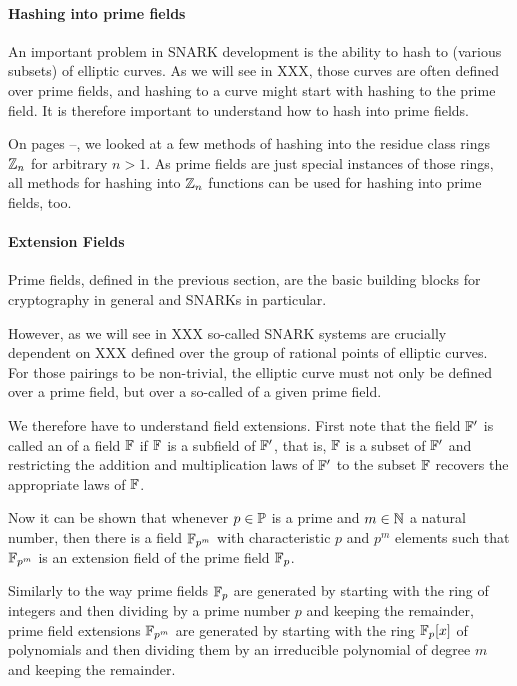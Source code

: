 \paragraph{Hashing into prime fields}\label{hashing-prime-fields}
An important problem in SNARK development is the ability to hash to (various subsets) of elliptic curves. As we will see in XXX, those curves are often defined over prime fields, and hashing to a curve might start with hashing to the prime field. It is therefore important to understand how to hash into prime fields.

On pages \pageref{hashing-start}--\pageref{hashing-end}, we looked at a few methods of hashing into the residue class rings $\mathbb{Z}_n$ for arbitrary $n>1$. As prime fields are just special instances of those rings, all methods for hashing into $\mathbb{Z}_n$ functions can be used for hashing into prime fields, too.
\paragraph{Extension Fields}\label{field-extension}
Prime fields, defined in the previous section, are the basic building blocks for cryptography in general and SNARKs in particular.

However, as we will see in XXX so-called  SNARK systems are crucially dependent on  XXX defined over the group of rational points of elliptic curves. For those pairings to be non-trivial, the elliptic curve must not only be defined over a prime field, but over a so-called  of a given prime field.

We therefore have to understand field extensions. First note that the field $\mathbb{F}'$ is called an  of a field $\mathbb{F}$ if $\mathbb{F}$ is a subfield of $\mathbb{F}'$, that is, $\mathbb{F}$ is a subset of $\mathbb{F}'$ and restricting the addition and multiplication laws of $\mathbb{F}'$ to the subset $\mathbb{F}$ recovers the appropriate laws of $\mathbb{F}$.

Now it can be shown that whenever $p\in \mathbb{P}$ is a prime and $m\in\mathbb{N}$ a natural number, then there is a field $\mathbb{F}_{p^m}$ with characteristic $p$ and $p^m$ elements such that $\mathbb{F}_{p^m}$ is an extension field of the prime field $\mathbb{F}_p$.

Similarly to the way prime fields $\mathbb{F}_p$ are generated by starting with the ring of integers and then dividing by a prime number $p$ and keeping the remainder, prime field extensions $\mathbb{F}_{p^m}$ are generated by starting with the ring $\mathbb{F}_p[x]$ of polynomials and then dividing them by an irreducible polynomial of degree $m$ and keeping the remainder.


